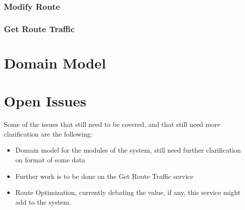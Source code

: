 \documentclass[a4paper,12pt]{article}
\begin{document}
\subsubsection{Modify Route}
\subsubsection{Get Route Traffic}

\section{Domain Model}

\section{Open Issues}
Some of the issues that still need to be covered, and that still need more clarification are the following:
\begin{itemize}
\item Domain model for the modules of the system, still need further clarification on format of some data
\item Further work is to be done on the Get Route Traffic service
\item Route Optimization, currently debating the value, if any, this service might add to the system.
\end{itemize}
\end{document}
